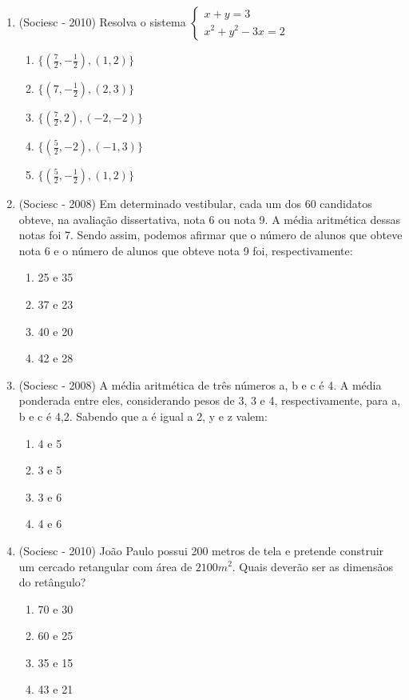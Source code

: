 \begin{enumerate}
 \item (Sociesc - 2010) Resolva o sistema 
  $\begin{cases}
    x+y= 3 \\
    x^2+ y^2 -3x=2
   \end{cases}$
  \begin{enumerate}
  \item $\{(\frac{7}{2}, -\frac{1}{2}), (1,2)\}$
  \item $\{(7, -\frac{1}{2}), (2,3)\}$
  \item $\{(\frac{7}{2}, 2), (-2,-2)\}$
  \item $\{(\frac{5}{2}, -2), (-1,3)\}$
  \item $\{(\frac{5}{2}, -\frac{1}{2}), (1,2)\}$
 \end{enumerate}
 
 \item (Sociesc - 2008) Em determinado vestibular, cada um dos 60 candidatos obteve, na avaliação dissertativa, nota 6 ou nota 9. A média aritmética dessas notas foi 7. Sendo assim, podemos afirmar que o número de alunos que obteve nota 6 e o número de alunos que obteve nota 9 foi, respectivamente:
  \begin{enumerate}
  \item 25 e 35
  \item 37 e 23
  \item 40 e 20
  \item 42 e 28
 \end{enumerate}
 
 \item (Sociesc - 2008) A média aritmética de três números a, b e c é 4. A média ponderada entre eles, considerando pesos de 3, 3 e 4, respectivamente, para a, b e c é 4,2. Sabendo que a é igual a 2, y e z valem:
  \begin{enumerate}
  \item 4 e 5
  \item 3 e 5
  \item 3 e 6
  \item 4 e 6
 \end{enumerate}
 
 \item (Sociesc - 2010) João Paulo possui 200 metros de tela e pretende construir um cercado retangular com área de $2100 m^2$. Quais deverão ser as dimensãos do retângulo?
  \begin{enumerate}
  \item 70 e 30
  \item 60 e 25
  \item 35 e 15
  \item 43 e 21
 \end{enumerate}
 

\end{enumerate}
